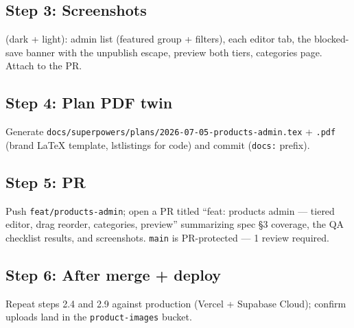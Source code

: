 \documentclass[11pt,a4paper]{article}
\begin{document}
\subsection*{Step 3: Screenshots}

(dark + light): admin list (featured group + filters), each editor tab, the blocked-save banner with the
unpublish escape, preview both tiers, categories page. Attach to the PR.

\subsection*{Step 4: Plan PDF twin}

Generate \texttt{docs/superpowers/plans/2026-07-05-products-admin.tex} + \texttt{.pdf} (brand LaTeX
template, lstlistings for code) and commit (\texttt{docs:} prefix).

\subsection*{Step 5: PR}

Push \texttt{feat/products-admin}; open a PR titled ``feat: products admin --- tiered editor, drag
reorder, categories, preview'' summarizing spec \S3 coverage, the QA checklist results, and screenshots.
\texttt{main} is PR-protected --- 1 review required.

\subsection*{Step 6: After merge + deploy}

Repeat steps 2.4 and 2.9 against production (Vercel + Supabase Cloud); confirm uploads land in the
\texttt{product-images} bucket.

\end{document}
